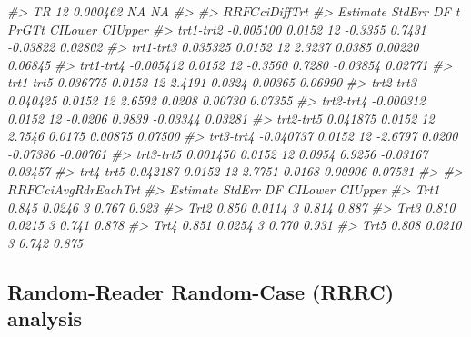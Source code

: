 \documentclass[
]{book}
\newenvironment{Shaded}{\begin{snugshade}}{\end{snugshade}}
\newcommand{\CommentTok}[1]{\textcolor[rgb]{0.56,0.35,0.01}{\textit{#1}}}
\begin{document}
\begin{Shaded}
\begin{Highlighting}[]
\CommentTok{\#\textgreater{} TR 12 0.000462  NA     NA}
\CommentTok{\#\textgreater{} }
\CommentTok{\#\textgreater{} $RRFC$ciDiffTrt}
\CommentTok{\#\textgreater{}            Estimate StdErr DF       t  PrGTt  CILower  CIUpper}
\CommentTok{\#\textgreater{} trt1{-}trt2 {-}0.005100 0.0152 12 {-}0.3355 0.7431 {-}0.03822  0.02802}
\CommentTok{\#\textgreater{} trt1{-}trt3  0.035325 0.0152 12  2.3237 0.0385  0.00220  0.06845}
\CommentTok{\#\textgreater{} trt1{-}trt4 {-}0.005412 0.0152 12 {-}0.3560 0.7280 {-}0.03854  0.02771}
\CommentTok{\#\textgreater{} trt1{-}trt5  0.036775 0.0152 12  2.4191 0.0324  0.00365  0.06990}
\CommentTok{\#\textgreater{} trt2{-}trt3  0.040425 0.0152 12  2.6592 0.0208  0.00730  0.07355}
\CommentTok{\#\textgreater{} trt2{-}trt4 {-}0.000312 0.0152 12 {-}0.0206 0.9839 {-}0.03344  0.03281}
\CommentTok{\#\textgreater{} trt2{-}trt5  0.041875 0.0152 12  2.7546 0.0175  0.00875  0.07500}
\CommentTok{\#\textgreater{} trt3{-}trt4 {-}0.040737 0.0152 12 {-}2.6797 0.0200 {-}0.07386 {-}0.00761}
\CommentTok{\#\textgreater{} trt3{-}trt5  0.001450 0.0152 12  0.0954 0.9256 {-}0.03167  0.03457}
\CommentTok{\#\textgreater{} trt4{-}trt5  0.042187 0.0152 12  2.7751 0.0168  0.00906  0.07531}
\CommentTok{\#\textgreater{} }
\CommentTok{\#\textgreater{} $RRFC$ciAvgRdrEachTrt}
\CommentTok{\#\textgreater{}      Estimate StdErr DF CILower CIUpper}
\CommentTok{\#\textgreater{} Trt1    0.845 0.0246  3   0.767   0.923}
\CommentTok{\#\textgreater{} Trt2    0.850 0.0114  3   0.814   0.887}
\CommentTok{\#\textgreater{} Trt3    0.810 0.0215  3   0.741   0.878}
\CommentTok{\#\textgreater{} Trt4    0.851 0.0254  3   0.770   0.931}
\CommentTok{\#\textgreater{} Trt5    0.808 0.0210  3   0.742   0.875}
\end{Highlighting}
\end{Shaded}

\hypertarget{ORApplications-RRRC-dataset04}{%
\subsection{Random-Reader Random-Case (RRRC) analysis}\label{ORApplications-RRRC-dataset04}}
\end{document}
